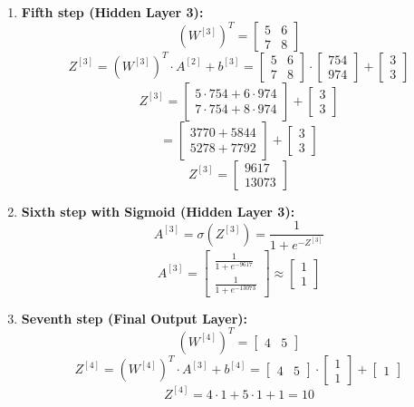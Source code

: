 \documentclass[a4paper,12pt]{article}
\begin{document}
\begin{enumerate}
    \item \textbf{Fifth step (Hidden Layer 3):}
    \[
    (W^{[3]})^T = \begin{bmatrix}
    5 & 6 \\
    7 & 8
    \end{bmatrix}
    \]
    \[
    Z^{[3]} = (W^{[3]})^T \cdot A^{[2]} + b^{[3]} = \begin{bmatrix}
    5 & 6 \\
    7 & 8
    \end{bmatrix} \cdot \begin{bmatrix} 754 \\ 974 \end{bmatrix} + \begin{bmatrix} 3 \\ 3 \end{bmatrix}
    \]
    \[
    Z^{[3]} = \begin{bmatrix}
    5 \cdot 754 + 6 \cdot 974 \\
    7 \cdot 754 + 8 \cdot 974
    \end{bmatrix} + \begin{bmatrix} 3 \\ 3 \end{bmatrix}
    \]
    \[
    = \begin{bmatrix} 3770 + 5844 \\ 5278 + 7792 \end{bmatrix} + \begin{bmatrix} 3 \\ 3 \end{bmatrix}
    \]
    \[
    Z^{[3]} = \begin{bmatrix} 9617 \\ 13073 \end{bmatrix}
    \]

    \item \textbf{Sixth step with Sigmoid (Hidden Layer 3):}
    \[
    A^{[3]} = \sigma(Z^{[3]}) = \frac{1}{1 + e^{-Z^{[3]}}}
    \]
    \[
    A^{[3]} = \begin{bmatrix} \frac{1}{1 + e^{-9617}} \\ \frac{1}{1 + e^{-13073}} \end{bmatrix} \approx \begin{bmatrix} 1 \\ 1 \end{bmatrix}
    \]

    \item \textbf{Seventh step (Final Output Layer):}
    \[
    (W^{[4]})^T = \begin{bmatrix} 4 & 5 \end{bmatrix}
    \]
    \[
    Z^{[4]} = (W^{[4]})^T \cdot A^{[3]} + b^{[4]} = \begin{bmatrix} 4 & 5 \end{bmatrix} \cdot \begin{bmatrix} 1 \\ 1 \end{bmatrix} + \begin{bmatrix} 1 \end{bmatrix}
    \]
    \[
    Z^{[4]} = 4 \cdot 1 + 5 \cdot 1 + 1 = 10
    \]


\end{enumerate}
\end{document}
